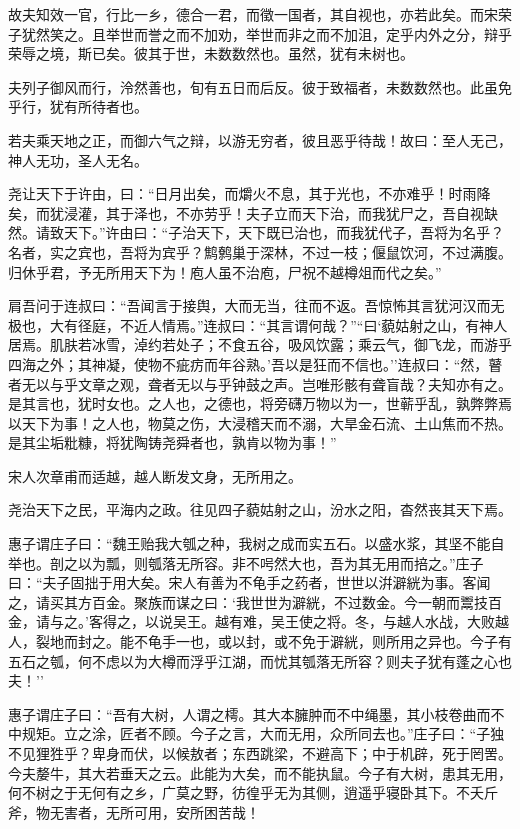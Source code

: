 \documentclass[]{article}
\begin{document}
故夫知效一官，行比一乡，德合一君，而徵一国者，其自视也，亦若此矣。而宋荣子犹然笑之。且举世而誉之而不加劝，举世而非之而不加沮，定乎内外之分，辩乎荣辱之境，斯已矣。彼其于世，未数数然也。虽然，犹有未树也。

夫列子御风而行，泠然善也，旬有五日而后反。彼于致福者，未数数然也。此虽免乎行，犹有所待者也。

若夫乘天地之正，而御六气之辩，以游无穷者，彼且恶乎待哉！故曰：至人无己，神人无功，圣人无名。

尧让天下于许由，曰：``日月出矣，而爝火不息，其于光也，不亦难乎！时雨降矣，而犹浸灌，其于泽也，不亦劳乎！夫子立而天下治，而我犹尸之，吾自视缺然。请致天下。''许由曰：``子治天下，天下既已治也，而我犹代子，吾将为名乎？名者，实之宾也，吾将为宾乎？鹪鹩巢于深林，不过一枝；偃鼠饮河，不过满腹。归休乎君，予无所用天下为！庖人虽不治庖，尸祝不越樽俎而代之矣。''

肩吾问于连叔曰：``吾闻言于接舆，大而无当，往而不返。吾惊怖其言犹河汉而无极也，大有径庭，不近人情焉。''连叔曰：``其言谓何哉？''``曰`藐姑射之山，有神人居焉。肌肤若冰雪，淖约若处子；不食五谷，吸风饮露；乘云气，御飞龙，而游乎四海之外；其神凝，使物不疵疠而年谷熟。'吾以是狂而不信也。''连叔曰：``然，瞽者无以与乎文章之观，聋者无以与乎钟鼓之声。岂唯形骸有聋盲哉？夫知亦有之。是其言也，犹时女也。之人也，之德也，将旁礴万物以为一，世蕲乎乱，孰弊弊焉以天下为事！之人也，物莫之伤，大浸稽天而不溺，大旱金石流、土山焦而不热。是其尘垢粃糠，将犹陶铸尧舜者也，孰肯以物为事！''

宋人次章甫而适越，越人断发文身，无所用之。

尧治天下之民，平海内之政。往见四子藐姑射之山，汾水之阳，杳然丧其天下焉。

惠子谓庄子曰：``魏王贻我大瓠之种，我树之成而实五石。以盛水浆，其坚不能自举也。剖之以为瓢，则瓠落无所容。非不呺然大也，吾为其无用而掊之。''庄子曰：``夫子固拙于用大矣。宋人有善为不龟手之药者，世世以洴澼絖为事。客闻之，请买其方百金。聚族而谋之曰：`我世世为澼絖，不过数金。今一朝而鬻技百金，请与之。'客得之，以说吴王。越有难，吴王使之将。冬，与越人水战，大败越人，裂地而封之。能不龟手一也，或以封，或不免于澼絖，则所用之异也。今子有五石之瓠，何不虑以为大樽而浮乎江湖，而忧其瓠落无所容？则夫子犹有蓬之心也夫！''

惠子谓庄子曰：``吾有大树，人谓之樗。其大本臃肿而不中绳墨，其小枝卷曲而不中规矩。立之涂，匠者不顾。今子之言，大而无用，众所同去也。''庄子曰：``子独不见狸狌乎？卑身而伏，以候敖者；东西跳梁，不避高下；中于机辟，死于罔罟。今夫嫠牛，其大若垂天之云。此能为大矣，而不能执鼠。今子有大树，患其无用，何不树之于无何有之乡，广莫之野，彷徨乎无为其侧，逍遥乎寝卧其下。不夭斤斧，物无害者，无所可用，安所困苦哉！
\end{document}
